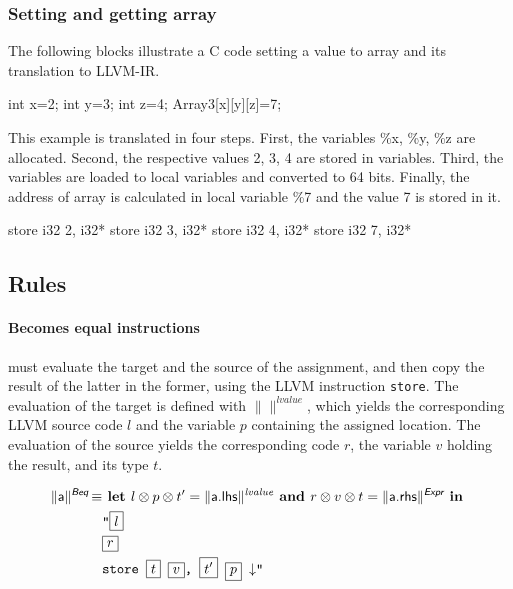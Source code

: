 \documentclass[10pt,a4paper]{article}
\newcommand{\trad}[2]{\ensuremath{\lVert \textsf{#1} \rVert^{\textit{#2}}}}
\newcommand{\nl}[0]{\ensuremath{\downarrow}}
\DeclareMathOperator{\isdef}{\equiv}
\newcommand{\llvm}[1]{\texttt{#1}}
\newcommand{\B}[1]{\textsf{#1}}
\newcommand{\LET}[0]{\textbf{ let }}
\newcommand{\IN}[0]{\textbf{ in }}
\newcommand{\AND}[0]{\textbf{ and }}
\newcommand{\PH}[1]{\framebox{$#1$}}
\newcommand{\sep}[0]{\otimes}
\begin{document}
\subsubsection{Setting and getting array}

The following blocks illustrate a C code setting a value to array
and its translation to LLVM-IR. 

\begin{ccode} 
  int x=2; int y=3; int z=4;
  Array3[x][y][z]=7;
\end{ccode}

This example is translated in four steps. First, the variables \%x, \%y, \%z 
are allocated. Second, the respective values 2, 3, 4 are stored in variables. 
Third, the variables are loaded to local variables and converted to 64 bits. 
Finally, the address of array is calculated in local variable \%7 and the value 
7 is stored in it.  

\begin{llvmcode}
store i32 2, i32* %
store i32 3, i32* %
store i32 4, i32* %
store i32 7, i32* %
\end{llvmcode}


\subsection{Rules}


\paragraph{Becomes equal instructions} must evaluate the target and the source
of the assignment, and then copy the result of the latter in the former, using
the LLVM instruction \llvm{store}. The evaluation of the target is defined with
$\trad{}{lvalue}$, which yields the corresponding LLVM source code $l$ and the
variable $p$ containing the assigned location. The evaluation of the source
yields the corresponding code $r$, the variable $v$ holding the result, and its
type $t$. 

\begin{align*}
\begin{split}
  \trad{a}{\B{Beq}} \isdef
  & \LET l \sep p \sep t'= \trad{a.lhs}{lvalue} \AND r \sep v \sep t = \trad{a.rhs}{\B{Expr}} \IN \\
  & \llvm{"\PH{l}} \\
  & \llvm{\PH{r}} \\
  & \llvm{store \PH{t} \PH{v}, \PH{t'} \PH{p} \nl"}
\end{split}
\end{align*}
\end{document}
